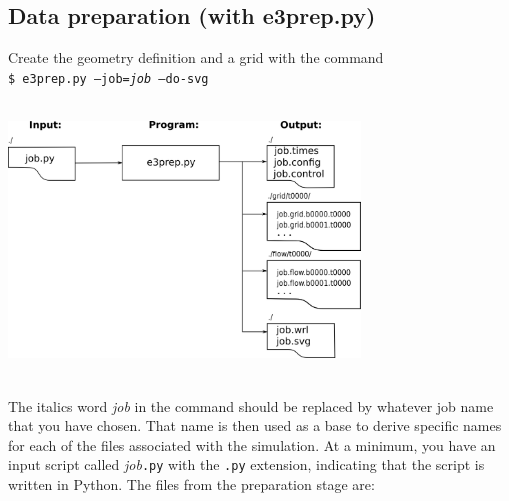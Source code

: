 \subsection{Data preparation (with e3prep.py)}
Create the geometry definition and a grid with the command\\
         \texttt{\$ e3prep.py --job=\textit{job} --do-svg }\\ 
         \vspace{0.25cm} \\
         \centerline{\includegraphics[width=0.7\textwidth]{figs/preparation.png}}\\
         The italics word \textit{job} in the command should be replaced 
         by whatever job name that you have chosen.
         That name is then used as a base to derive specific names for each of
         the files associated with the simulation.
         At a minimum, you have an input script called \textit{job}\texttt{.py} 
         with the \texttt{.py} extension, indicating that the script is written in Python.
         The files from the preparation stage are:
